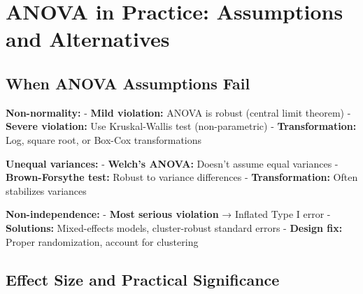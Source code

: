 \documentclass[
  11pt,
  letterpaper,
  oneside]{book}
\begin{document}
\section{ANOVA in Practice: Assumptions and
Alternatives}\label{anova-in-practice-assumptions-and-alternatives}

\subsection{When ANOVA Assumptions
Fail}\label{when-anova-assumptions-fail}

\begin{tcolorbox}[enhanced jigsaw, left=2mm, opacityback=0, titlerule=0mm, leftrule=.75mm, colbacktitle=quarto-callout-warning-color!10!white, title=\textcolor{quarto-callout-warning-color}{\faExclamationTriangle}\hspace{0.5em}{Assumption Violations and Solutions}, breakable, opacitybacktitle=0.6, rightrule=.15mm, colframe=quarto-callout-warning-color-frame, toprule=.15mm, bottomrule=.15mm, bottomtitle=1mm, toptitle=1mm, coltitle=black, arc=.35mm, colback=white]

\textbf{Non-normality:} - \textbf{Mild violation:} ANOVA is robust
(central limit theorem) - \textbf{Severe violation:} Use Kruskal-Wallis
test (non-parametric) - \textbf{Transformation:} Log, square root, or
Box-Cox transformations

\textbf{Unequal variances:} - \textbf{Welch's ANOVA:} Doesn't assume
equal variances - \textbf{Brown-Forsythe test:} Robust to variance
differences - \textbf{Transformation:} Often stabilizes variances

\textbf{Non-independence:} - \textbf{Most serious violation} → Inflated
Type I error - \textbf{Solutions:} Mixed-effects models, cluster-robust
standard errors - \textbf{Design fix:} Proper randomization, account for
clustering

\end{tcolorbox}

\subsection{Effect Size and Practical
Significance}\label{effect-size-and-practical-significance}
\end{document}
